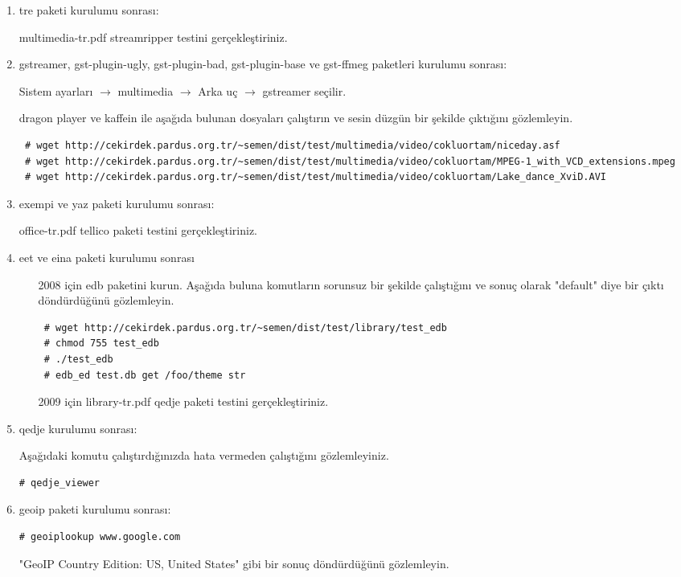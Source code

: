 \documentclass[a4paper,10pt]{article}
\begin{document}
\begin{enumerate}
\item tre paketi kurulumu sonrası:

multimedia-tr.pdf streamripper testini gerçekleştiriniz.

\item gstreamer, gst-plugin-ugly, gst-plugin-bad, gst-plugin-base ve gst-ffmeg paketleri kurulumu sonrası:

Sistem ayarları $\rightarrow$ multimedia $\rightarrow$ Arka uç $\rightarrow$ gstreamer seçilir. 

dragon player ve kaffein ile aşağıda bulunan dosyaları çalıştırın ve sesin düzgün bir şekilde çıktığını gözlemleyin.
\begin{verbatim}
 # wget http://cekirdek.pardus.org.tr/~semen/dist/test/multimedia/video/cokluortam/niceday.asf
 # wget http://cekirdek.pardus.org.tr/~semen/dist/test/multimedia/video/cokluortam/MPEG-1_with_VCD_extensions.mpeg
 # wget http://cekirdek.pardus.org.tr/~semen/dist/test/multimedia/video/cokluortam/Lake_dance_XviD.AVI
\end{verbatim}

\item exempi ve yaz paketi kurulumu sonrası:

office-tr.pdf tellico paketi testini gerçekleştiriniz.

\item eet ve eina paketi kurulumu sonrası
\begin{itemize}
 \item [2008 için] edb paketini kurun. Aşağıda buluna komutların sorunsuz bir şekilde çalıştığını ve sonuç olarak "default" diye bir çıktı döndürdüğünü gözlemleyin.
\begin{verbatim}
 # wget http://cekirdek.pardus.org.tr/~semen/dist/test/library/test_edb
 # chmod 755 test_edb
 # ./test_edb
 # edb_ed test.db get /foo/theme str
\end{verbatim}
\item [2009 için] library-tr.pdf qedje paketi testini gerçekleştiriniz.
\end{itemize}

\item qedje kurulumu sonrası:

Aşağıdaki komutu çalıştırdığınızda hata vermeden çalıştığını gözlemleyiniz.
\begin{verbatim}
# qedje_viewer
\end{verbatim}

\item geoip paketi kurulumu sonrası:
\begin{verbatim}
# geoiplookup www.google.com 
\end{verbatim}
"GeoIP Country Edition: US, United States" gibi bir sonuç döndürdüğünü gözlemleyin.


\end{enumerate}
\end{document}
